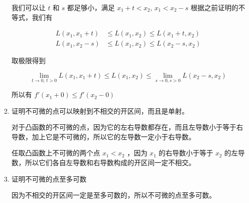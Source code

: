 \documentclass[12pt,a4paper]{ctexart}
\begin{document}
\begin{enumerate}
我们可以让 $t$ 和 $s$ 都足够小，满足 $x_1 +t < x_2,\, x_1 < x_2 -s$ 根据之前证明的不等式，我们有

\begin{align*}
    L(x_1, x_1 + t) &\le L(x_1, x_2) \le L(x_1+t, x_2) \\
    L(x_1, x_2-s) &\le L(x_1,x_2) \le L(x_2 -s, x_2)
\end{align*}

取极限得到

\[
\lim_{t \to 0,\,t>0}L(x_1, x_1 + t)\le L(x_1,x_2) \le \lim_{s \to 0, s>0}L(x_2 -s,x_2)
\]

所以有 $f'(x_1+0) \le f'(x_2 - 0)$

\item 证明不可微的点可以映射到不相交的开区间，而且是单射。

对于凸函数的不可微的点，因为它的左右导数都存在，而且左导数小于等于右导数，加上它是不可微的，所以它的左导数一定小于右导数。

任取凸函数上不可微的两个点 $x_1 < x_2$ ，因为 $x_1$ 的右导数小于等于 $x_2$ 的左导数，所以它们各自左导数和右导数构成的开区间一定不相交。

\item  证明不可微的点至多可数

因为不相交的开区间一定是至多可数的，所以不可微的点至多可数。

\end{enumerate}
\end{document}
